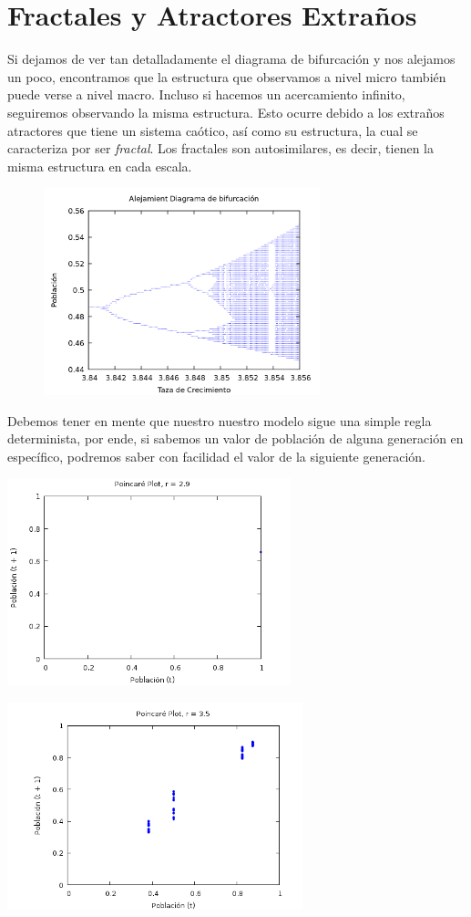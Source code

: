 \documentclass{article}
\begin{document}
\section{Fractales y Atractores Extraños}
Si dejamos de ver tan detalladamente el diagrama de bifurcación y nos alejamos un poco, encontramos que la estructura que observamos a nivel micro también puede verse a nivel macro. Incluso si hacemos un acercamiento infinito, seguiremos observando la misma estructura. Esto ocurre debido a los extraños atractores que tiene un sistema caótico, así como su estructura, la cual se caracteriza por ser \textit{fractal}. Los fractales son autosimilares, es decir, tienen la misma estructura en cada escala.

	\begin{figure}[h!]
    \includegraphics[height=6cm]{graf5.png}
    \centering
    \end{figure}

Debemos tener en mente que nuestro nuestro modelo sigue una simple regla determinista, por ende, si sabemos un valor de población de alguna generación en específico, podremos saber con facilidad el valor de la siguiente generación.

	\begin{center}
    \includegraphics[height=6cm]{graf6.png}
    \end{center}
    \begin{center}
    \includegraphics[height=6cm]{graf7.png}
    \end{center}
\end{document}
